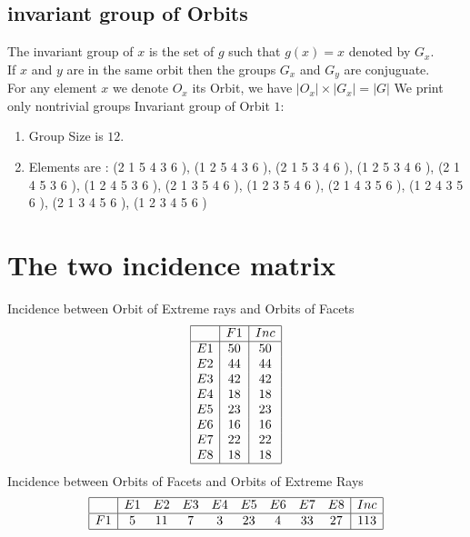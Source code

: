 \documentclass[12pt]{article}
\begin{document}
\subsection{invariant group of Orbits}
\noindent The invariant group of $x$ is the set of $g$ such that $g(x)=x$ denoted by $G_x$.\\
If $x$ and $y$ are in the same orbit then the groups $G_x$ and  $G_y$ are conjuguate.\\
For any element $x$ we denote $O_x$ its Orbit, we have $|O_x|\times |G_x|=|G|$
We print only nontrivial groups
Invariant group of Orbit $1$:
\begin{enumerate}
\item Group Size is $12$.
\item Elements are : (2 1 5 4 3 6  ), (1 2 5 4 3 6  ), (2 1 5 3 4 6  ), (1 2 5 3 4 6  ), (2 1 4 5 3 6  ), (1 2 4 5 3 6  ), (2 1 3 5 4 6  ), (1 2 3 5 4 6  ), (2 1 4 3 5 6  ), (1 2 4 3 5 6  ), (2 1 3 4 5 6  ), (1 2 3 4 5 6  )
\end{enumerate}
\section{The two incidence matrix}
Incidence between Orbit of Extreme rays and Orbits of Facets
\begin{equation*}
\begin{array}{|c|c|c|}
\hline
&F1&Inc\\
\hline
E1&50&50\\
E2&44&44\\
E3&42&42\\
E4&18&18\\
E5&23&23\\
E6&16&16\\
E7&22&22\\
E8&18&18\\
\hline
\end{array}
\end{equation*}
Incidence between Orbits of Facets and Orbits of Extreme Rays
\begin{equation*}
\begin{array}{|c|cccccccc|c|}
\hline
&E1&E2&E3&E4&E5&E6&E7&E8&Inc\\
\hline
F1&5&11&7&3&23&4&33&27&113\\
\hline
\end{array}
\end{equation*}
\end{document}
